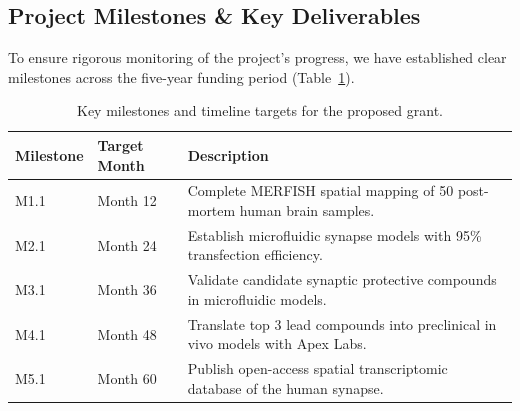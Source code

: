 \subsection{Project Milestones \& Key Deliverables}
To ensure rigorous monitoring of the project's progress, we have established clear milestones across the five-year funding period (Table~\ref{tab:milestones}).

\begin{table}[htbp]
\centering
\sffamily\small
\renewcommand{\arraystretch}{1.2}
\begin{tabularx}{\textwidth}{l l X}
\toprule
\rowcolor{secondarycolor}
\textbf{\color{white}Milestone} & \textbf{\color{white}Target Month} & \textbf{\color{white}Description} \\
\midrule
M1.1 & Month 12 & Complete MERFISH spatial mapping of 50 post-mortem human brain samples. \\
\rowcolor{bgcolor}
M2.1 & Month 24 & Establish microfluidic synapse models with 95\% transfection efficiency. \\
M3.1 & Month 36 & Validate candidate synaptic protective compounds in microfluidic models. \\
\rowcolor{bgcolor}
M4.1 & Month 48 & Translate top 3 lead compounds into preclinical in vivo models with Apex Labs. \\
M5.1 & Month 60 & Publish open-access spatial transcriptomic database of the human synapse. \\
\bottomrule
\end{tabularx}
\caption{Key milestones and timeline targets for the proposed grant.}
\label{tab:milestones}
\end{table}
